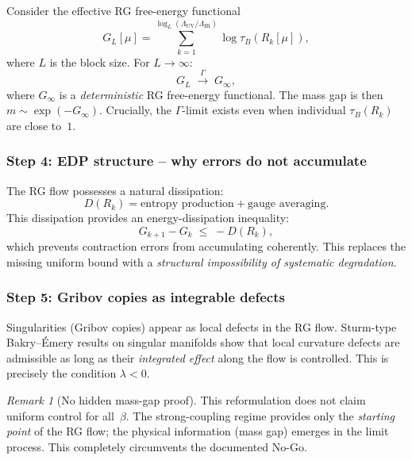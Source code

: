 \documentclass[12pt,a4paper]{article}
\theoremstyle{definition}
\theoremstyle{plain}
\theoremstyle{remark}
\newtheorem{remark}[definition]{Remark}
\begin{document}
Consider the effective RG free-energy functional
\begin{equation}\label{eq:rg-functional}
  G_L[\mu] = \sum_{k=1}^{\log_L(\Lambda_{\mathrm{UV}}/\Lambda_{\mathrm{IR}})} \log \tau_B(R_k[\mu]),
\end{equation}
where $L$ is the block size. For $L \to \infty$:
\[
  G_L \;\xrightarrow{\;\Gamma\;}\; G_\infty,
\]
where $G_\infty$ is a \emph{deterministic} RG free-energy functional. The mass gap is then $m \sim \exp(-G_\infty)$. Crucially, the $\Gamma$-limit exists even when individual $\tau_B(R_k)$ are close to~$1$.

\subsubsection*{Step 4: EDP structure -- why errors do not accumulate}

The RG flow possesses a natural dissipation:
\[
  D(R_k) = \text{entropy production} + \text{gauge averaging}.
\]
This dissipation provides an energy-dissipation inequality:
\begin{equation}\label{eq:edp-rg}
  G_{k+1} - G_k \;\leq\; -D(R_k),
\end{equation}
which prevents contraction errors from accumulating coherently. This replaces the missing uniform bound with a \emph{structural impossibility of systematic degradation}.

\subsubsection*{Step 5: Gribov copies as integrable defects}

Singularities (Gribov copies) appear as local defects in the RG flow. Sturm-type Bakry--\'Emery results on singular manifolds \cite{Sturm2025} show that local curvature defects are admissible as long as their \emph{integrated effect} along the flow is controlled. This is precisely the condition $\lambda < 0$.

\begin{remark}[No hidden mass-gap proof]\label{rem:no-hidden-proof}
This reformulation does not claim uniform control for all~$\beta$. The strong-coupling regime provides only the \emph{starting point} of the RG flow; the physical information (mass gap) emerges in the limit process. This completely circumvents the documented No-Go.
\end{remark}
\end{document}
